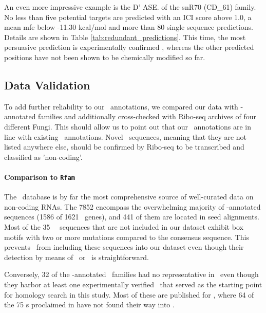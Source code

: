 An even more impressive example is the D' ASE. of the snR70 (CD\_61)
family.  No less than five potential targets are predicted with an ICI
score above 1.0, a mean mfe below -11.30 kcal/mol and more than 80 single
sequence predictions. Details are shown in Table
\ref{tab:redundant_predictions}. This time, the most persuasive prediction
is experimentally confirmed \cite{Lowe:1999}, whereas the other predicted
positions have not been shown to be chemically modified so far.

\subsection{Data Validation}

To add further reliability to our \sno\ annotations, we compared our data
with \rfam -annotated families and additionally cross-checked with Ribo-seq
archives of four different Fungi. This should allow us to point out that
our \snostrip\ annotations are in line with existing \rfam\
annotations. Novel \sno\ sequences, meaning that they are not listed
anywhere else, should be confirmed by Ribo-seq to be transcribed and
classified as 'non-coding'.
 
\paragraph{\textbf{Comparison to \texttt{Rfam}}}
The \rfam\ database \cite{Nawrocki:2015} is by far the most comprehensive
source of well-curated data on non-coding RNAs. The 7852 \PFS{detected \sno
  s detected by \snostrip} encompass the overwhelming majority of \rfam
-annotated sequences (1586 of 1621 \sno\ genes), and 441 of them are
located in seed alignments.  Most of the 35 \rfam\ \sno\ sequences that are
not included in our dataset exhibit box motifs with two or more mutations
compared to the consensus sequence. This prevents \snostrip\ from including
these sequences into our dataset even though their detection by means of
\blast\ or \infernal\ is straightforward.

Conversely, 32 of the \snostrip -annotated \sno\ families had no
representative in \rfam\ even though they harbor at least one
experimentally verified \sno\ that served as the starting point for
homology search in this study. Most of these are published for \ncr, where
64 of the 75 \sno s proclaimed in \cite{Liu:2009} have not found their way
into \rfam.

